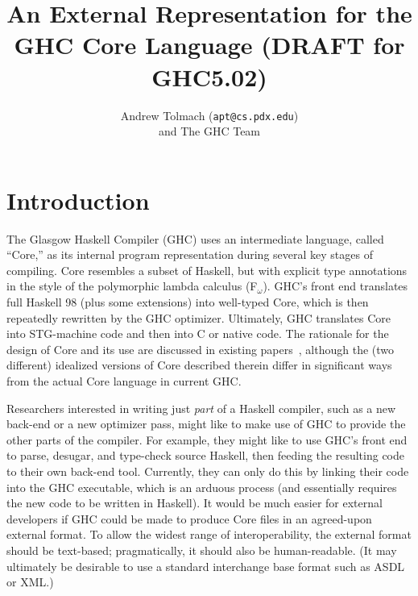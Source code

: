 \documentclass[10pt]{article}
\begin{document}
\title{An External Representation for the GHC Core Language (DRAFT for GHC5.02)}
\author{Andrew Tolmach ({\tt apt@cs.pdx.edu})\\and The GHC Team}

\maketitle
\makeatactive


\section{Introduction}

The Glasgow Haskell Compiler (GHC) uses an intermediate language, called
``Core,''  as its internal program representation during
several key stages of compiling.
Core resembles a subset of Haskell, but with explicit type annotations
in the style of the polymorphic lambda calculus (F$_\omega$).
GHC's front end translates full Haskell 98 (plus some extensions) into
well-typed Core, which is then repeatedly rewritten by the GHC optimizer.
Ultimately, GHC translates Core into STG-machine code and then into
C or native code.  The rationale for the design of Core and its use are discussed
in existing papers~\cite{ghc-inliner,comp-by-trans-scp}, although the (two different)
idealized versions of Core described therein differ in significant ways
from the actual Core language in current GHC.

Researchers interested in writing just {\it part} of a Haskell compiler,
such as a new back-end or a new optimizer pass, might like to make
use of GHC to provide the other parts of the compiler.  For example, they
might like to use GHC's front end to parse, desugar, and type-check source Haskell,
then feeding the resulting code to their own back-end tool.
Currently, they can only do this by linking their code into the
GHC executable, which is an arduous process (and essentially requires
the new code to be written in Haskell).   It would be much easier for
external developers if GHC could be made to produce Core files in
an agreed-upon external format.  To allow the widest range of interoperability,
the external format should be text-based; pragmatically, it should
also be human-readable. (It may ultimately be desirable to use a
standard interchange base format such as ASDL or XML.)
\end{document}

